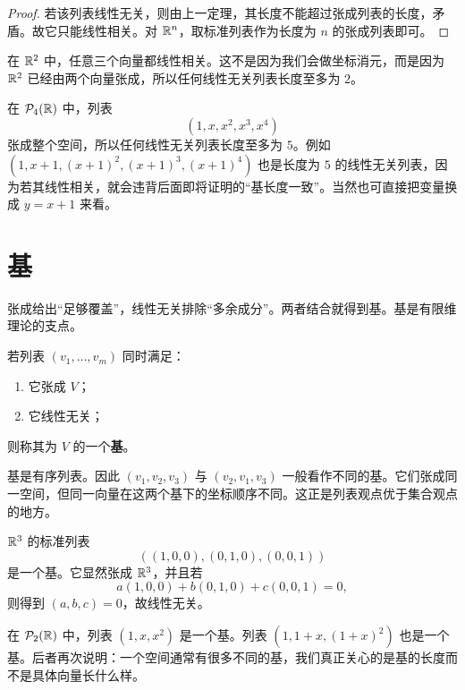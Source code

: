 \begin{proof} 若该列表线性无关，则由上一定理，其长度不能超过张成列表的长度，矛盾。故它只能线性相关。对 $\mathbb{R}^n$，取标准列表作为长度为 $n$ 的张成列表即可。
\end{proof}

\begin{example} 在 $\mathbb{R}^2$ 中，任意三个向量都线性相关。这不是因为我们会做坐标消元，而是因为 $\mathbb{R}^2$ 已经由两个向量张成，所以任何线性无关列表长度至多为 $2$。
\end{example}

\begin{example} 在 $\mathcal{P}_4(\mathbb{R})$ 中，列表
\[ (1,x,x^2,x^3,x^4) \]
张成整个空间，所以任何线性无关列表长度至多为 $5$。例如 $(1,x+1,(x+1)^2,(x+1)^3,(x+1)^4)$ 也是长度为 $5$ 的线性无关列表，因为若其线性相关，就会违背后面即将证明的“基长度一致”。当然也可直接把变量换成 $y=x+1$ 来看。
\end{example}

\section{基}

张成给出“足够覆盖”，线性无关排除“多余成分”。两者结合就得到基。基是有限维理论的支点。

\begin{definition} 若列表 $(v_1,\dots,v_m)$ 同时满足：

\begin{enumerate}[label=\textnormal{(\arabic*)}]
\item 它张成 $V$；
\item 它线性无关；
\end{enumerate}

则称其为 $V$ 的一个\textbf{基}。
\end{definition}

\begin{remark} 基是有序列表。因此 $(v_1,v_2,v_3)$ 与 $(v_2,v_1,v_3)$ 一般看作不同的基。它们张成同一空间，但同一向量在这两个基下的坐标顺序不同。这正是列表观点优于集合观点的地方。
\end{remark}

\begin{example} $\mathbb{R}^3$ 的标准列表
\[ ((1,0,0),(0,1,0),(0,0,1)) \]
是一个基。它显然张成 $\mathbb{R}^3$，并且若
\[ a(1,0,0)+b(0,1,0)+c(0,0,1)=0, \]
则得到 $(a,b,c)=0$，故线性无关。
\end{example}

\begin{example} 在 $\mathcal{P}_2(\mathbb{R})$ 中，列表 $(1,x,x^2)$ 是一个基。列表 $(1,1+x,(1+x)^2)$ 也是一个基。后者再次说明：一个空间通常有很多不同的基，我们真正关心的是基的长度而不是具体向量长什么样。
\end{example}

